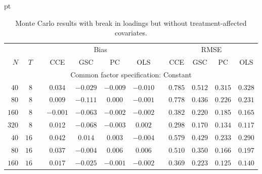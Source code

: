 \documentclass[12pt,fleqn]{article}
\begin{document}
  \begin{table}[H]
  \caption{Monte Carlo results with break in loadings but without treatment-affected covariates.}\label{tab:mc_break}
   pt
  \centering
  \par
  \begin{tabular}{rrcccccccccc}
  \hline\hline
   {\small $$} & {\small $$} & {\small $$} & \multicolumn{4}{c}{\small Bias} & {\small $$} & \multicolumn{4}{c}{\small RMSE}\\ \cline{4-7}\cline{9-12}
   {\small $N$} & {\small $T$} & {\small $$} & {\small CCE} & {\small GSC} & {\small PC} & {\small OLS} & {\small $$} & {\small CCE} & {\small GSC} & {\small PC} & {\small OLS} \\\hline
   \multicolumn{12}{c}{\small Common factor specification: Constant}\\
   {\small $40$} & {\small $8$} & {\small $$} & {\small $0.034$} & {\small $-0.029$} & {\small $-0.009$} & {\small $-0.010$} & {\small $$} & {\small $0.785$} & {\small $0.512$} & {\small $0.315$} & {\small $0.328$} \\
   {\small $80$} & {\small $8$} & {\small $$} & {\small $0.009$} & {\small $-0.111$} & {\small $0.000$} & {\small $-0.001$} & {\small $$} & {\small $0.778$} & {\small $0.436$} & {\small $0.226$} & {\small $0.231$} \\
   {\small $160$} & {\small $8$} & {\small $$} & {\small $-0.001$} & {\small $-0.063$} & {\small $-0.002$} & {\small $-0.002$} & {\small $$} & {\small $0.382$} & {\small $0.220$} & {\small $0.185$} & {\small $0.165$} \\
   {\small $320$} & {\small $8$} & {\small $$} & {\small $0.012$} & {\small $-0.068$} & {\small $-0.003$} & {\small $0.002$} & {\small $$} & {\small $0.298$} & {\small $0.170$} & {\small $0.134$} & {\small $0.117$} \\
   {\small $40$} & {\small $16$} & {\small $$} & {\small $0.042$} & {\small $0.014$} & {\small $0.003$} & {\small $-0.004$} & {\small $$} & {\small $0.579$} & {\small $0.429$} & {\small $0.233$} & {\small $0.290$} \\
   {\small $80$} & {\small $16$} & {\small $$} & {\small $0.037$} & {\small $-0.004$} & {\small $0.006$} & {\small $0.006$} & {\small $$} & {\small $0.510$} & {\small $0.350$} & {\small $0.166$} & {\small $0.197$} \\
   {\small $160$} & {\small $16$} & {\small $$} & {\small $0.017$} & {\small $-0.025$} & {\small $-0.001$} & {\small $-0.002$} & {\small $$} & {\small $0.369$} & {\small $0.223$} & {\small $0.125$} & {\small $0.140$} \\

\end{tabular}
\end{table}
\end{document}
